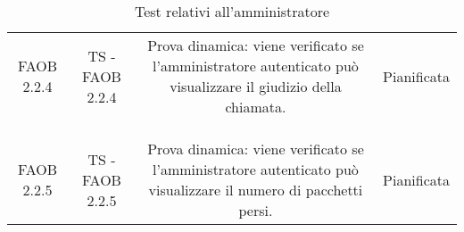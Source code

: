 {{\begin{table}[h!]
\begin{center}
\begin{minipage}{1\linewidth}
\begin{tabular}{c c c c}
						FAOB 2.2.4
						&
						TS - FAOB 2.2.4		
						& 
						\begin{minipage}{0.55\linewidth}
							Prova dinamica: viene verificato se l'amministratore
							autenticato può visualizzare il giudizio della chiamata.
						\end{minipage}	
						&
						Pianificata
						\\
						\\
						\bottomrule
						\\\\
						FAOB 2.2.5
						&
						TS - FAOB 2.2.5		
						& 
						\begin{minipage}{0.55\linewidth}
							Prova dinamica: viene verificato se l'amministratore
							autenticato può visualizzare il numero di pacchetti persi.
						\end{minipage}	
						&
						Pianificata
						\\  
						\bottomrule
						\end{tabular}
					\end{minipage}
				
			\end{center}	
			\caption{Test relativi all'amministratore}
		\end{table}
	}

	\newpage

}
